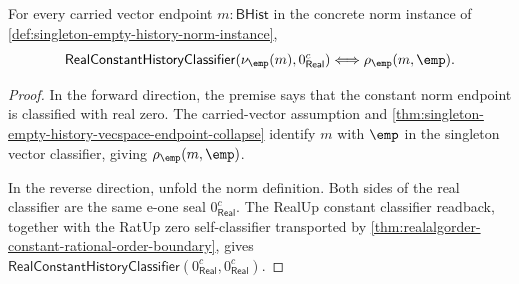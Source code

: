 \begin{theorem}
\label{thm:singleton-empty-history-norm-zero-exactness}
For every carried vector endpoint $m:\mathsf{BHist}$ in the concrete norm
instance of \autoref{def:singleton-empty-history-norm-instance},
$$
\mathsf{RealConstantHistoryClassifier}(\nu_{\emp}(m),0_{\mathsf{Real}}^{c})
\Longleftrightarrow
\rho_{\emp}(m,\emp).
$$
\end{theorem}
\begin{proof}
In the forward direction, the premise says that the constant norm endpoint is
classified with real zero. The carried-vector assumption and
\autoref{thm:singleton-empty-history-vecspace-endpoint-collapse} identify
$m$ with $\emp$ in the singleton vector classifier, giving
$\rho_{\emp}(m,\emp)$.

In the reverse direction, unfold the norm definition. Both sides of the real
classifier are the same e-one seal $0_{\mathsf{Real}}^{c}$. The RealUp constant
classifier readback, together with the RatUp zero self-classifier transported
by \autoref{thm:realalgorder-constant-rational-order-boundary}, gives
$\mathsf{RealConstantHistoryClassifier}(0_{\mathsf{Real}}^{c},0_{\mathsf{Real}}^{c})$.
\end{proof}

